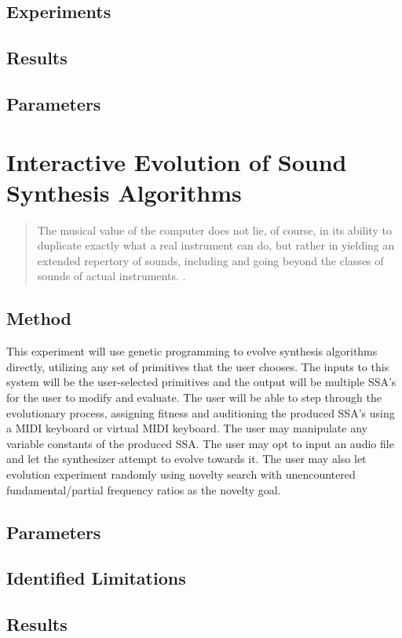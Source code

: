 \documentclass[12pt]{article}
\begin{document}
\subsection{Experiments}
\subsection{Results}
\subsection{Parameters}

\section{Interactive Evolution of Sound Synthesis Algorithms}
\begin{quote}
The musical value of the computer does not lie, of course, in its ability to duplicate exactly what a real instrument can do, but rather in yielding an extended repertory of sounds, including and going beyond the classes of sounds of actual instruments. \citep{risset1969analysis}.
\end{quote}
\subsection{Method}
This experiment will use genetic programming to evolve synthesis algorithms directly, utilizing any set of primitives that the user chooses. The inputs to this system will be the user-selected primitives and the output will be multiple SSA's for the user to modify and evaluate. The user will be able to step through the evolutionary process, assigning fitness and auditioning the produced SSA's using a MIDI keyboard or virtual MIDI keyboard. The user may manipulate any variable constants of the produced SSA. The user may opt to input an audio file and let the synthesizer attempt to evolve towards it. The user may also let evolution experiment randomly using novelty search with unencountered fundamental/partial frequency ratios as the novelty goal.
\subsection{Parameters}
\subsection{Identified Limitations}
\subsection{Results}
\end{document}
